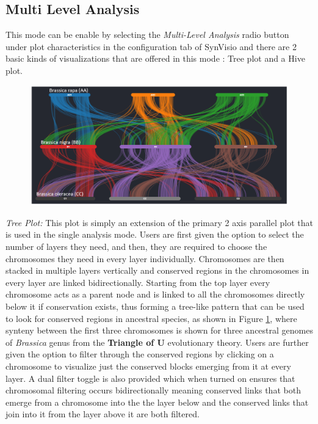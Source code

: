 \subsection{Multi Level Analysis}
This mode can be enable by selecting the \textit{Multi-Level Analysis} radio button under plot characteristics in the configuration tab of SynVisio and there are 2 basic kinds of visualizations that are offered in this mode : Tree plot and a Hive plot.

\begin{figure}
  \centering
  \includegraphics[width=1\linewidth]{images/ch_5_tree_plot.PNG}
  \label{fig:ch_5_tree_plot}
\end{figure} 

\textit{Tree Plot:} This plot is simply an extension of the primary 2 axis parallel plot that is used in the single analysis mode. Users are first given the option to select the number of layers they need, and then, they are required to choose the chromosomes they need in every layer individually. Chromosomes are then stacked in multiple layers vertically and conserved regions in the chromosomes in every layer are linked bidirectionally. Starting from the top layer every chromosome acts as a parent node and is linked to all the chromosomes directly below it if conservation exists, thus forming a tree-like pattern that can be used to look for conserved regions in ancestral species, as shown in Figure \ref{fig:ch_5_tree_plot}, where synteny between the first three chromosomes is shown for three ancestral genomes of \textit{Brassica} genus from the \textbf{Triangle of U} evolutionary theory\cite{cheng2014genome}. Users are further given the option to filter through the conserved regions by clicking on a chromosome to visualize just the conserved blocks emerging from it at every layer. A dual filter toggle is also provided which when turned on ensures that chromosomal filtering occurs bidirectionally meaning conserved links that both emerge from a chromosome into the the layer below and the conserved links that join into it from the layer above it are both filtered.

